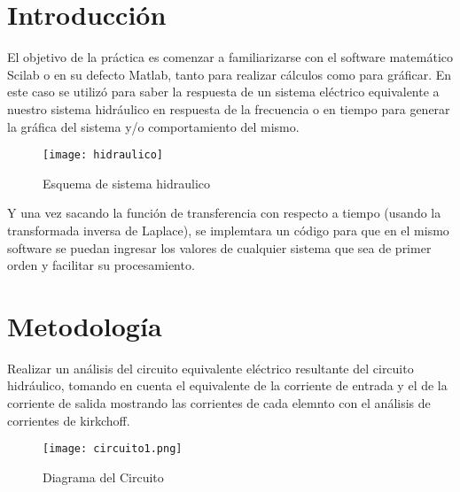 \documentclass[letterpaper,10pt]{article}
\begin{document}
	\section{Introducción}
	\vspace*{0.3in}
	El objetivo de la práctica es comenzar a familiarizarse con el software matemático Scilab o en su defecto Matlab, tanto para realizar cálculos como para gráficar. En este caso se utilizó para saber la respuesta de un sistema eléctrico  equivalente a nuestro sistema hidráulico en respuesta de la frecuencia o en tiempo para generar la gráfica del sistema y/o comportamiento del mismo.
	
	\begin{figure}[h!]
		\centering
		\texttt{[image: hidraulico]}
		\caption{Esquema de sistema hidraulico}
	\end{figure}
	
	\vspace*{0.3in}
	Y una vez sacando la función de transferencia con respecto a tiempo (usando la transformada inversa de Laplace), se implemtara un código para que en el mismo software se puedan ingresar los valores de cualquier sistema que sea de primer orden y facilitar su procesamiento.
	
	\pagebreak
    \section{Metodología}
    \vspace*{0.3in}
    	Realizar un análisis del circuito equivalente eléctrico resultante del circuito hidráulico, tomando en cuenta el equivalente de la corriente de entrada y el de la corriente de salida mostrando las corrientes de cada elemnto con el análisis de corrientes de kirkchoff. 
    
    \vspace*{0.3in}
    	\begin{figure}[h!]
    		\centering
    		\texttt{[image: circuito1.png]}
    		\caption{Diagrama del Circuito}
    	\end{figure}
    
\end{document}
